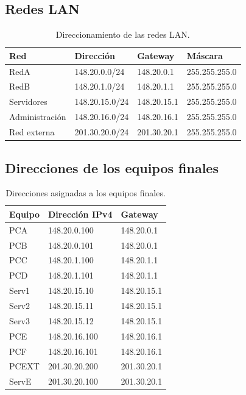 \documentclass[12pt,a4paper]{article}
\begin{document}
\subsection{Redes LAN}

\begin{table}[H]
\centering
\small
\begin{tabular}{|l|l|l|l|}
\hline
\textbf{Red} & \textbf{Dirección} & \textbf{Gateway} & \textbf{Máscara} \\
\hline
RedA & 148.20.0.0/24 & 148.20.0.1 & 255.255.255.0 \\
\hline
RedB & 148.20.1.0/24 & 148.20.1.1 & 255.255.255.0 \\
\hline
Servidores & 148.20.15.0/24 & 148.20.15.1 & 255.255.255.0 \\
\hline
Administración & 148.20.16.0/24 & 148.20.16.1 & 255.255.255.0 \\
\hline
Red externa & 201.30.20.0/24 & 201.30.20.1 & 255.255.255.0 \\
\hline
\end{tabular}
\caption{Direccionamiento de las redes LAN.}
\end{table}

\subsection{Direcciones de los equipos finales}

\begin{table}[H]
\centering
\small
\begin{tabular}{|l|l|l|}
\hline
\textbf{Equipo} & \textbf{Dirección IPv4} & \textbf{Gateway} \\
\hline
PCA & 148.20.0.100 & 148.20.0.1 \\
\hline
PCB & 148.20.0.101 & 148.20.0.1 \\
\hline
PCC & 148.20.1.100 & 148.20.1.1 \\
\hline
PCD & 148.20.1.101 & 148.20.1.1 \\
\hline
Serv1 & 148.20.15.10 & 148.20.15.1 \\
\hline
Serv2 & 148.20.15.11 & 148.20.15.1 \\
\hline
Serv3 & 148.20.15.12 & 148.20.15.1 \\
\hline
PCE & 148.20.16.100 & 148.20.16.1 \\
\hline
PCF & 148.20.16.101 & 148.20.16.1 \\
\hline
PCEXT & 201.30.20.200 & 201.30.20.1 \\
\hline
ServE & 201.30.20.100 & 201.30.20.1 \\
\hline
\end{tabular}
\caption{Direcciones asignadas a los equipos finales.}
\end{table}
\end{document}
